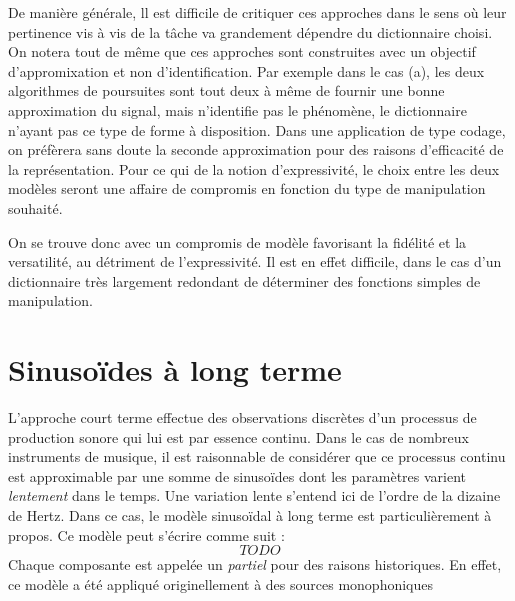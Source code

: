 De manière générale, ll est difficile de critiquer ces approches dans le sens où leur pertinence vis à vis de la tâche va grandement dépendre du dictionnaire choisi. On notera tout de même que ces approches sont construites avec un objectif d'appromixation et non d'identification. Par exemple dans le cas (a), les deux algorithmes de poursuites sont tout deux à même de fournir une bonne approximation du signal, mais \og n'identifie \fg pas le phénomène, le dictionnaire n'ayant pas ce type de forme à disposition. Dans une application de type codage, on préfèrera sans doute la seconde approximation pour des raisons d'efficacité de la représentation. Pour ce qui de la notion d'expressivité, le choix entre les deux modèles seront une affaire de compromis en fonction du type de manipulation souhaité.

On se trouve donc avec un compromis de modèle favorisant la fidélité et la versatilité, au détriment de l'expressivité. Il est en effet difficile, dans le cas d'un dictionnaire très largement redondant de déterminer des fonctions simples de manipulation.



\section{ \nmu Sinusoïdes à long terme}  \label{sec:slt}

L'approche court terme effectue des observations discrètes d'un processus de production sonore qui lui est par essence continu. Dans le cas de nombreux instruments de musique, il est raisonnable de considérer que ce processus continu est approximable par une somme de sinusoïdes dont les paramètres varient \textsl{lentement} dans le temps. Une variation lente s'entend ici de l'ordre de la dizaine de Hertz. Dans ce cas, le modèle sinusoïdal à long terme est particulièrement à propos. Ce modèle peut s'écrire comme suit :
\begin{equation}
  TODO
\label{eq:slt}
\end{equation}
Chaque composante est appelée un \textsl{partiel} pour des raisons historiques. En effet, ce modèle a été appliqué originellement à des sources monophoniques

